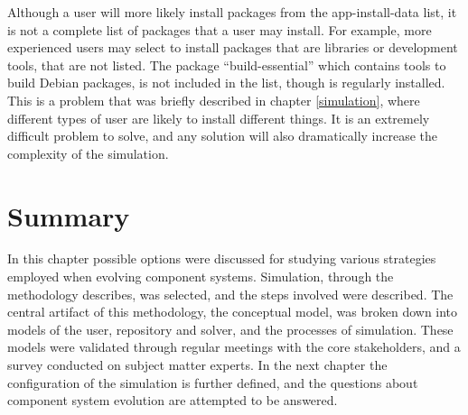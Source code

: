 Although a user will more likely install packages from the app-install-data list, it is not a complete list of packages that a user may install. 
For example, more experienced users may select to install packages that are libraries or development tools, that are not listed.
The package ``build-essential'' which contains tools to build Debian packages, is not included in the list, though is regularly installed.
This is a problem that was briefly described in chapter \ref{simulation}, where different types of user are likely to install different things.
It is an extremely difficult problem to solve, and any solution will also dramatically increase the complexity of the simulation.



\section{Summary}
{}In this chapter possible options were discussed for studying various strategies employed when evolving component systems.
{}Simulation, through the methodology \citep{Law2005} describes, was selected, and the steps involved were described.
{}The central artifact of this methodology, the conceptual model, was broken down into models of the user, repository and solver, and the processes of simulation.
{}These models were validated through regular meetings with the core stakeholders, and a survey conducted on subject matter experts.
{}In the next chapter the configuration of the simulation is further defined, and the questions about component system evolution are attempted to be answered.
